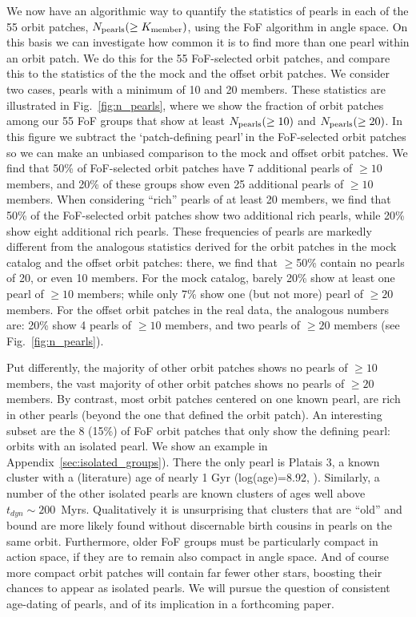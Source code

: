\documentclass[twocolumn]{aastex631}
\begin{document}
We now have an algorithmic way to quantify the statistics of pearls in each of the 55 orbit patches, $N_{\rm pearls}(\ge K_{\rm member})$, using the FoF algorithm in angle space. On this basis we can investigate how common it is to find more than one pearl within an orbit patch. We do this for the 55 FoF-selected orbit patches, and compare this to the statistics of the the mock and the offset orbit patches. We consider two cases, pearls with a minimum of 10 and 20 members. These statistics are illustrated in Fig.~\ref{fig:n_pearls}, where we show the fraction of orbit patches among our 55 FoF groups that show at least $N_{\rm pearls}(\ge 10)$ and $N_{\rm pearls}(\ge 20)$. 
In this figure we subtract the \textquoteleft patch-defining pearl\textquoteright\,in the FoF-selected orbit patches so we can make an unbiased comparison to the mock and offset orbit patches. We find that 50\% of FoF-selected orbit patches have 7 additional pearls of $\ge 10$ members, and 20\% of these groups show even 25 additional pearls of $\ge 10$ members. 
When considering ``rich'' pearls of at least 20 members, we find that 50\% of the FoF-selected orbit patches show two additional rich pearls, while 20\% show eight additional rich pearls. These frequencies of pearls are markedly different from the analogous statistics derived for the orbit patches in the mock catalog and the offset orbit patches: there, we find
that $\ge$50\% contain no pearls of 20, or even 10 members. For the mock catalog, barely 20\% show at least one pearl of $\ge 10$ members; while only 7\% show one (but not more) pearl of $\ge 20$ members. For the offset orbit patches in the real data, the analogous numbers are: 20\% show 4 pearls of $\ge 10$ members, and two pearls of $\ge 20$ members (see Fig.~\ref{fig:n_pearls}). 

Put differently, the majority of other orbit patches shows no pearls of $\ge 10$ members, the vast majority of other orbit patches shows no pearls of $\ge 20$ members. By contrast, most orbit patches centered on one known pearl, are rich in other pearls (beyond the one that defined the orbit patch). An interesting subset are the 8 (15\%) of FoF orbit patches that only show the defining pearl: orbits with an isolated pearl. We show an example in Appendix~\ref{sec:isolated_groups}). There the only pearl is Platais 3, a known cluster with a (literature) age of nearly 1 Gyr (log(age)=8.92, \citet{2018A&A...615A..12Y}). Similarly, a number of the other isolated pearls are known clusters of ages well above $t_{dyn}\sim 200$~Myrs. Qualitatively it is unsurprising that clusters that are ``old'' and bound are more likely found without discernable birth cousins in pearls on the same orbit. Furthermore, older FoF groups must be particularly compact in action space, if they are to remain also compact in angle space. And of course more compact orbit patches will contain far fewer other stars, boosting their chances to appear as isolated pearls. We will pursue the question of consistent age-dating of pearls, and of its implication in a forthcoming paper. 
\end{document}
